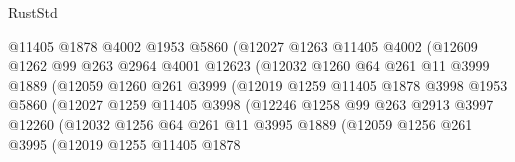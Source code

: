 \begin{lexlean}{RustStd}
\begin{coremodule}
                            @11405
                            @1878
                            @4002
                            @1953
                            @5860
                            (@12027
                              @1263
                              @11405
                              @4002
                              (@12609
                                @1262
                                @99
                                @263
                                @2964
                                @4001
                                @12623
                                (@12032
                                  @1260
                                  @64
                                  @261
                                  @11
                                  @3999
                                  @1889
                                  (@12059
                                    @1260
                                    @261
                                    @3999
                                    (@12019
                                      @1259
                                      @11405
                                      @1878
                                      @3998
                                      @1953
                                      @5860
                                      (@12027
                                        @1259
                                        @11405
                                        @3998
                                        (@12246
                                          @1258
                                          @99
                                          @263
                                          @2913
                                          @3997
                                          @12260
                                          (@12032
                                            @1256
                                            @64
                                            @261
                                            @11
                                            @3995
                                            @1889
                                            (@12059
                                              @1256
                                              @261
                                              @3995
                                              (@12019
                                                @1255
                                                @11405
                                                @1878

\end{coremodule}
\end{lexlean}
